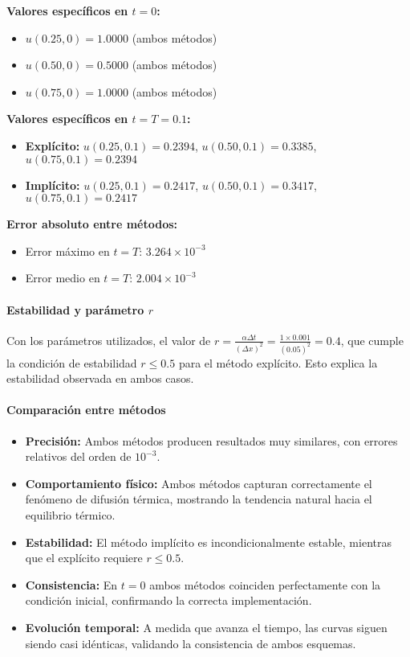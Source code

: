 \documentclass[12pt,a4paper]{article}
\begin{document}
\textbf{Valores específicos en $t = 0$:}
\begin{itemize}
    \item $u(0.25, 0) = 1.0000$ (ambos métodos)
    \item $u(0.50, 0) = 0.5000$ (ambos métodos)
    \item $u(0.75, 0) = 1.0000$ (ambos métodos)
\end{itemize}

\textbf{Valores específicos en $t = T = 0.1$:}
\begin{itemize}
    \item \textbf{Explícito:} $u(0.25, 0.1) = 0.2394$, $u(0.50, 0.1) = 0.3385$, $u(0.75, 0.1) = 0.2394$
    \item \textbf{Implícito:} $u(0.25, 0.1) = 0.2417$, $u(0.50, 0.1) = 0.3417$, $u(0.75, 0.1) = 0.2417$
\end{itemize}

\textbf{Error absoluto entre métodos:}
\begin{itemize}
    \item Error máximo en $t = T$: $3.264 \times 10^{-3}$
    \item Error medio en $t = T$: $2.004 \times 10^{-3}$
\end{itemize}

\paragraph{Estabilidad y parámetro $r$}

Con los parámetros utilizados, el valor de $r = \frac{\alpha \Delta t}{(\Delta x)^2} = \frac{1 \times 0.001}{(0.05)^2} = 0.4$, que cumple la condición de estabilidad $r \leq 0.5$ para el método explícito. Esto explica la estabilidad observada en ambos casos.

\paragraph{Comparación entre métodos}

\begin{itemize}
    \item \textbf{Precisión:} Ambos métodos producen resultados muy similares, con errores relativos del orden de $10^{-3}$.
    \item \textbf{Comportamiento físico:} Ambos métodos capturan correctamente el fenómeno de difusión térmica, mostrando la tendencia natural hacia el equilibrio térmico.
    \item \textbf{Estabilidad:} El método implícito es incondicionalmente estable, mientras que el explícito requiere $r \leq 0.5$.
    \item \textbf{Consistencia:} En $t=0$ ambos métodos coinciden perfectamente con la condición inicial, confirmando la correcta implementación.
    \item \textbf{Evolución temporal:} A medida que avanza el tiempo, las curvas siguen siendo casi idénticas, validando la consistencia de ambos esquemas.
\end{itemize}
\end{document}
